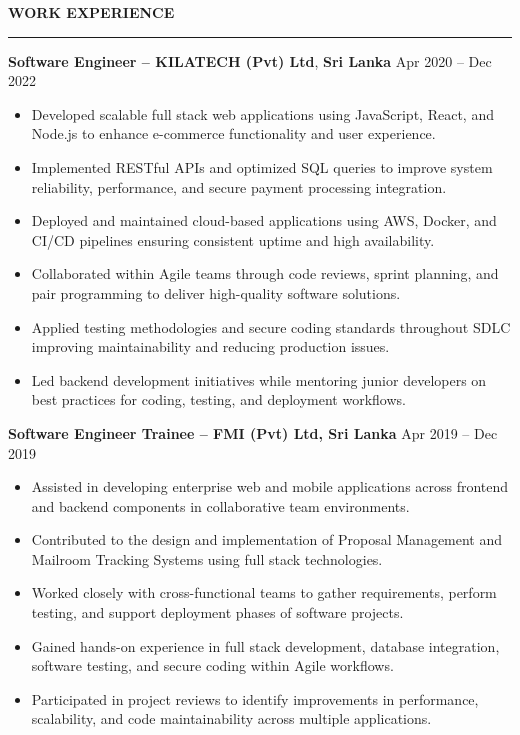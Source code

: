 \documentclass[10pt,letterpaper]{article}
\begin{document}
\textbf{WORK EXPERIENCE}\\[-8pt]
\noindent\rule{\textwidth}{1pt}

\vspace{-2pt}

\textbf{Software Engineer -- KILATECH (Pvt) Ltd}, \textbf{Sri Lanka} \hfill Apr 2020 -- Dec 2022

\vspace{-1pt}

\begin{itemize}
\item Developed scalable full stack web applications using JavaScript, React, and Node.js to enhance e-commerce functionality and user experience.
\item Implemented RESTful APIs and optimized SQL queries to improve system reliability, performance, and secure payment processing integration.
\item Deployed and maintained cloud-based applications using AWS, Docker, and CI/CD pipelines ensuring consistent uptime and high availability.
\item Collaborated within Agile teams through code reviews, sprint planning, and pair programming to deliver high-quality software solutions.
\item Applied testing methodologies and secure coding standards throughout SDLC improving maintainability and reducing production issues.
\item Led backend development initiatives while mentoring junior developers on best practices for coding, testing, and deployment workflows.
\end{itemize}

\textbf{Software Engineer Trainee -- FMI (Pvt) Ltd, Sri Lanka} \hfill Apr 2019 -- Dec 2019

\vspace{-1pt}

\begin{itemize}
\item Assisted in developing enterprise web and mobile applications across frontend and backend components in collaborative team environments.
\item Contributed to the design and implementation of Proposal Management and Mailroom Tracking Systems using full stack technologies.
\item Worked closely with cross-functional teams to gather requirements, perform testing, and support deployment phases of software projects.
\item Gained hands-on experience in full stack development, database integration, software testing, and secure coding within Agile workflows.
\item Participated in project reviews to identify improvements in performance, scalability, and code maintainability across multiple applications.
\end{itemize}
\end{document}
